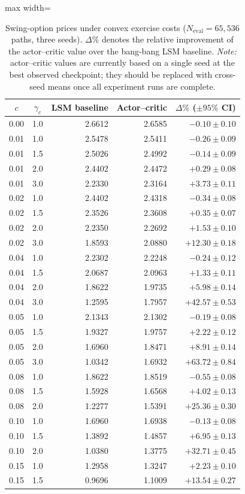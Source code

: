 \documentclass[a4paper,fleqn]{cas-dc}
\begin{document}
\begin{table}[htbp]
\centering
\caption{Swing-option prices under convex exercise costs ($N_{\mathrm{eval}} = 65{,}536$ paths, three seeds).
$\Delta\%$ denotes the relative improvement of the actor--critic value over the bang-bang LSM baseline.
\emph{Note:} actor--critic values are currently based on a single seed at the best observed checkpoint; they should be replaced with cross-seed means once all experiment runs are complete.}
\label{tab:results}
\begin{adjustbox}{max width=\linewidth}
\begin{tabular}{ccrrr}
\toprule
$c$ & $\gamma_c$ & LSM baseline & Actor--critic & $\Delta\%$ ($\pm 95\%$ CI) \\
\midrule
0.00 & 1.0 & 2.6612 & 2.6585 & $-0.10 \pm 0.10$ \\
0.01 & 1.0 & 2.5478 & 2.5411 & $-0.26 \pm 0.09$ \\
0.01 & 1.5 & 2.5026 & 2.4992 & $-0.14 \pm 0.09$ \\
0.01 & 2.0 & 2.4402 & 2.4472 & $+0.29 \pm 0.08$ \\
0.01 & 3.0 & 2.2330 & 2.3164 & $+3.73 \pm 0.11$ \\
\midrule
0.02 & 1.0 & 2.4402 & 2.4318 & $-0.34 \pm 0.08$ \\
0.02 & 1.5 & 2.3526 & 2.3608 & $+0.35 \pm 0.07$ \\
0.02 & 2.0 & 2.2350 & 2.2692 & $+1.53 \pm 0.10$ \\
0.02 & 3.0 & 1.8593 & 2.0880 & $+12.30 \pm 0.18$ \\
\midrule
0.04 & 1.0 & 2.2302 & 2.2248 & $-0.24 \pm 0.12$ \\
0.04 & 1.5 & 2.0687 & 2.0963 & $+1.33 \pm 0.11$ \\
0.04 & 2.0 & 1.8622 & 1.9735 & $+5.98 \pm 0.14$ \\
0.04 & 3.0 & 1.2595 & 1.7957 & $+42.57 \pm 0.53$ \\
\midrule
0.05 & 1.0 & 2.1343 & 2.1302 & $-0.19 \pm 0.08$ \\
0.05 & 1.5 & 1.9327 & 1.9757 & $+2.22 \pm 0.12$ \\
0.05 & 2.0 & 1.6960 & 1.8471 & $+8.91 \pm 0.14$ \\
0.05 & 3.0 & 1.0342 & 1.6932 & $+63.72 \pm 0.84$ \\
\midrule
0.08 & 1.0 & 1.8622 & 1.8519 & $-0.55 \pm 0.08$ \\
0.08 & 1.5 & 1.5928 & 1.6568 & $+4.02 \pm 0.13$ \\
0.08 & 2.0 & 1.2277 & 1.5391 & $+25.36 \pm 0.30$ \\
\midrule
0.10 & 1.0 & 1.6960 & 1.6938 & $-0.13 \pm 0.08$ \\
0.10 & 1.5 & 1.3892 & 1.4857 & $+6.95 \pm 0.13$ \\
0.10 & 2.0 & 1.0380 & 1.3775 & $+32.71 \pm 0.45$ \\
\midrule
0.15 & 1.0 & 1.2958 & 1.3247 & $+2.23 \pm 0.10$ \\
0.15 & 1.5 & 0.9696 & 1.1009 & $+13.54 \pm 0.27$ \\
\bottomrule
\end{tabular}
\end{adjustbox}
\end{table}
\end{document}
